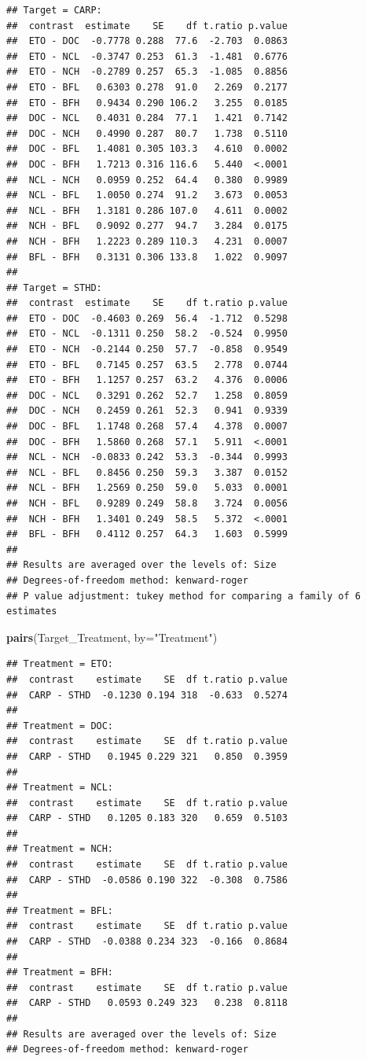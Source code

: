 \documentclass[
]{article}
\newenvironment{Shaded}{\begin{snugshade}}{\end{snugshade}}
\newcommand{\AttributeTok}[1]{\textcolor[rgb]{0.13,0.29,0.53}{#1}}
\newcommand{\FunctionTok}[1]{\textcolor[rgb]{0.13,0.29,0.53}{\textbf{#1}}}
\newcommand{\NormalTok}[1]{#1}
\newcommand{\StringTok}[1]{\textcolor[rgb]{0.31,0.60,0.02}{#1}}
\begin{document}
\begin{verbatim}
## Target = CARP:
##  contrast  estimate    SE    df t.ratio p.value
##  ETO - DOC  -0.7778 0.288  77.6  -2.703  0.0863
##  ETO - NCL  -0.3747 0.253  61.3  -1.481  0.6776
##  ETO - NCH  -0.2789 0.257  65.3  -1.085  0.8856
##  ETO - BFL   0.6303 0.278  91.0   2.269  0.2177
##  ETO - BFH   0.9434 0.290 106.2   3.255  0.0185
##  DOC - NCL   0.4031 0.284  77.1   1.421  0.7142
##  DOC - NCH   0.4990 0.287  80.7   1.738  0.5110
##  DOC - BFL   1.4081 0.305 103.3   4.610  0.0002
##  DOC - BFH   1.7213 0.316 116.6   5.440  <.0001
##  NCL - NCH   0.0959 0.252  64.4   0.380  0.9989
##  NCL - BFL   1.0050 0.274  91.2   3.673  0.0053
##  NCL - BFH   1.3181 0.286 107.0   4.611  0.0002
##  NCH - BFL   0.9092 0.277  94.7   3.284  0.0175
##  NCH - BFH   1.2223 0.289 110.3   4.231  0.0007
##  BFL - BFH   0.3131 0.306 133.8   1.022  0.9097
## 
## Target = STHD:
##  contrast  estimate    SE    df t.ratio p.value
##  ETO - DOC  -0.4603 0.269  56.4  -1.712  0.5298
##  ETO - NCL  -0.1311 0.250  58.2  -0.524  0.9950
##  ETO - NCH  -0.2144 0.250  57.7  -0.858  0.9549
##  ETO - BFL   0.7145 0.257  63.5   2.778  0.0744
##  ETO - BFH   1.1257 0.257  63.2   4.376  0.0006
##  DOC - NCL   0.3291 0.262  52.7   1.258  0.8059
##  DOC - NCH   0.2459 0.261  52.3   0.941  0.9339
##  DOC - BFL   1.1748 0.268  57.4   4.378  0.0007
##  DOC - BFH   1.5860 0.268  57.1   5.911  <.0001
##  NCL - NCH  -0.0833 0.242  53.3  -0.344  0.9993
##  NCL - BFL   0.8456 0.250  59.3   3.387  0.0152
##  NCL - BFH   1.2569 0.250  59.0   5.033  0.0001
##  NCH - BFL   0.9289 0.249  58.8   3.724  0.0056
##  NCH - BFH   1.3401 0.249  58.5   5.372  <.0001
##  BFL - BFH   0.4112 0.257  64.3   1.603  0.5999
## 
## Results are averaged over the levels of: Size 
## Degrees-of-freedom method: kenward-roger 
## P value adjustment: tukey method for comparing a family of 6 estimates
\end{verbatim}

\begin{Shaded}
\begin{Highlighting}[]
\FunctionTok{pairs}\NormalTok{(Target\_Treatment, }\AttributeTok{by=}\StringTok{"Treatment"}\NormalTok{)}
\end{Highlighting}
\end{Shaded}

\begin{verbatim}
## Treatment = ETO:
##  contrast    estimate    SE  df t.ratio p.value
##  CARP - STHD  -0.1230 0.194 318  -0.633  0.5274
## 
## Treatment = DOC:
##  contrast    estimate    SE  df t.ratio p.value
##  CARP - STHD   0.1945 0.229 321   0.850  0.3959
## 
## Treatment = NCL:
##  contrast    estimate    SE  df t.ratio p.value
##  CARP - STHD   0.1205 0.183 320   0.659  0.5103
## 
## Treatment = NCH:
##  contrast    estimate    SE  df t.ratio p.value
##  CARP - STHD  -0.0586 0.190 322  -0.308  0.7586
## 
## Treatment = BFL:
##  contrast    estimate    SE  df t.ratio p.value
##  CARP - STHD  -0.0388 0.234 323  -0.166  0.8684
## 
## Treatment = BFH:
##  contrast    estimate    SE  df t.ratio p.value
##  CARP - STHD   0.0593 0.249 323   0.238  0.8118
## 
## Results are averaged over the levels of: Size 
## Degrees-of-freedom method: kenward-roger
\end{verbatim}
\end{document}
